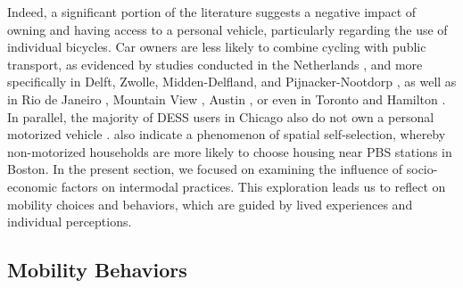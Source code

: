 \begin{refsegment}
Indeed, a significant portion of the literature suggests a negative impact of owning and having access to a personal vehicle, particularly regarding the use of individual bicycles. Car owners are less likely to combine cycling with public transport, as evidenced by studies conducted in the Netherlands \textcolor{blue}{\autocite[281]{debrezion_modelling_2009}}, and more specifically in Delft, Zwolle, Midden-Delfland, and Pijnacker-Nootdorp \textcolor{blue}{\autocite[115]{heinen_multimodal_2014}}, as well as in Rio de Janeiro \textcolor{blue}{\autocite[65]{souza_modelling_2017}}, Mountain View \textcolor{blue}{\autocite[657]{park_finding_2014}}, Austin \textcolor{blue}{\autocite[3491]{li_exploring_2017}}, or even in Toronto and Hamilton \textcolor{blue}{\autocite[2174]{chan_factors_2020}}. In parallel, the majority of \acrshort{DESS} users in Chicago also do not own a personal motorized vehicle \textcolor{blue}{\autocite[11]{mohammadian_analyzing_2022}}. \textcolor{blue}{\textcite[15]{basu_planning_2021}} also indicate a phenomenon of spatial self-selection, whereby non-motorized households are more likely to choose housing near \acrshort{PBS} stations in Boston. In the present section, we focused on examining the influence of socio-economic factors on intermodal practices. This exploration leads us to reflect on mobility choices and behaviors, which are guided by lived experiences and individual perceptions.%

\subsection{Mobility Behaviors
    \label{chap2:comportements-mobilite}
    }


\end{refsegment}
